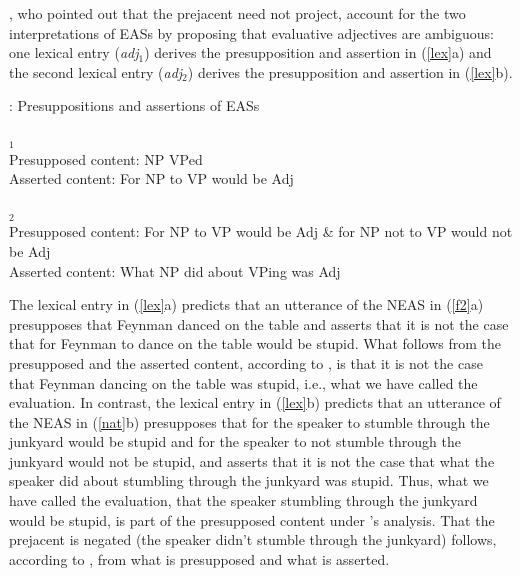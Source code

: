 \documentclass[11pt,fleqn]{article}
\newcommand{\6}{\mbox{$[\hspace*{-.6mm}[$}}
\newcommand{\9}{\mbox{$]\hspace*{-.6mm}]$}}
\newcommand{\citepos}[1]{\citeauthor{#1}'s \citeyear{#1}}
\begin{document}
\citet{karttunen-etal2014}, who pointed out that the prejacent need not project, account for the two interpretations of EASs by proposing that evaluative adjectives are ambiguous: one lexical entry ({\em adj}$_1$) derives the presupposition and assertion in (\ref{lex}a) and the second lexical entry ({\em adj}$_2$) derives the presupposition and assertion in (\ref{lex}b).

\begin{exe}
\ex\label{lex} \citealt[249]{karttunen-etal2014}: Presuppositions and assertions of EASs 
\begin{xlist}
$_1$
\\ Presupposed content: NP VPed
\\ Asserted content: For NP to VP would be Adj

$_2$
\\ Presupposed content: For NP to VP would be Adj \& for NP not to VP would not be Adj
\\ Asserted content: What NP did about VPing was Adj

\end{xlist}
\end{exe}
The lexical entry in (\ref{lex}a) predicts that an utterance of the NEAS in (\ref{f2}a) presupposes that Feynman danced on the table and asserts that it is not the case that for Feynman to dance on the table would be stupid. What follows from the presupposed and the asserted content, according to \citealt[248]{karttunen-etal2014}, is that it is not the case that Feynman dancing on the table was stupid, i.e., what we have called the evaluation. In contrast, the lexical entry in (\ref{lex}b) predicts that an utterance of the NEAS in (\ref{nat}b) presupposes that for the speaker to stumble through the junkyard would be stupid and for the speaker to not stumble through the junkyard would not be stupid, and asserts that it is not the case that what the speaker did about stumbling through the junkyard was stupid. Thus, what we have called the evaluation, that the speaker stumbling through the junkyard would be stupid, is part of the presupposed content under \citepos{karttunen-etal2014} analysis. That the prejacent is negated (the speaker didn't stumble through the junkyard) follows, according to \citealt[249]{karttunen-etal2014}, from what is presupposed and what is asserted.
\end{document}
